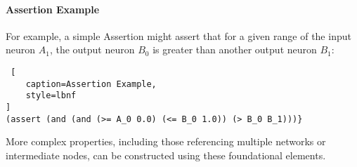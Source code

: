 \paragraph{Assertion Example}
For example, a simple Assertion might assert that for a given range of the input neuron $A_1$, the output neuron $B_0$ 
is greater than another output neuron $B_1$:
\begin{lstlisting} [
	caption=Assertion Example, 
	style=lbnf
]
(assert (and (and (>= A_0 0.0) (<= B_0 1.0)) (> B_0 B_1)))}
\end{lstlisting}
More complex properties, including those referencing multiple networks or intermediate nodes, can be constructed using these foundational elements.
